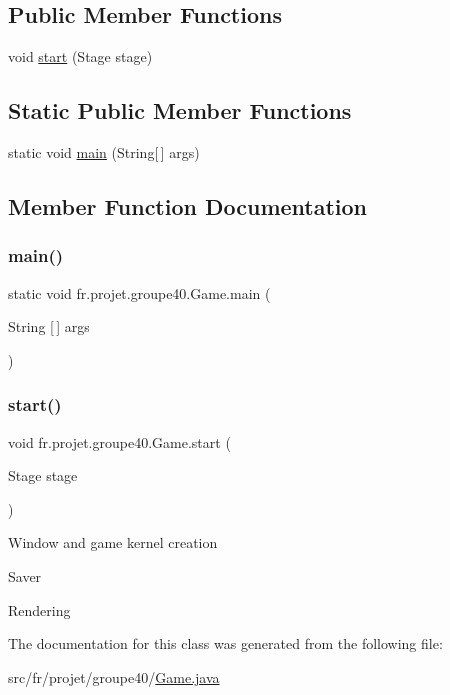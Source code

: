 \subsection*{Public Member Functions}
\begin{DoxyCompactItemize}
\item 
void \hyperlink{classfr_1_1projet_1_1groupe40_1_1_game_a14c7cab9da212de8525efe1edf9ccf11}{start} (Stage stage)
\end{DoxyCompactItemize}
\subsection*{Static Public Member Functions}
\begin{DoxyCompactItemize}
\item 
static void \hyperlink{classfr_1_1projet_1_1groupe40_1_1_game_a2e45b68f672116ffe2189ff4185f0cc9}{main} (String\mbox{[}$\,$\mbox{]} args)
\end{DoxyCompactItemize}


\subsection{Member Function Documentation}
\mbox{\label{classfr_1_1projet_1_1groupe40_1_1_game_a2e45b68f672116ffe2189ff4185f0cc9}} 
\subsubsection{\texorpdfstring{main()}{main()}}
{\footnotesize\ttfamily static void fr.\+projet.\+groupe40.\+Game.\+main (\begin{DoxyParamCaption}\item[{String \mbox{[}$\,$\mbox{]}}]{args }\end{DoxyParamCaption})\hspace{0.3cm}{\ttfamily [static]}}

\mbox{\label{classfr_1_1projet_1_1groupe40_1_1_game_a14c7cab9da212de8525efe1edf9ccf11}} 
\subsubsection{\texorpdfstring{start()}{start()}}
{\footnotesize\ttfamily void fr.\+projet.\+groupe40.\+Game.\+start (\begin{DoxyParamCaption}\item[{Stage}]{stage }\end{DoxyParamCaption})}

Window and game kernel creation

Saver

Rendering 

The documentation for this class was generated from the following file\+:\begin{DoxyCompactItemize}
\item 
src/fr/projet/groupe40/\hyperlink{_game_8java}{Game.\+java}\end{DoxyCompactItemize}
